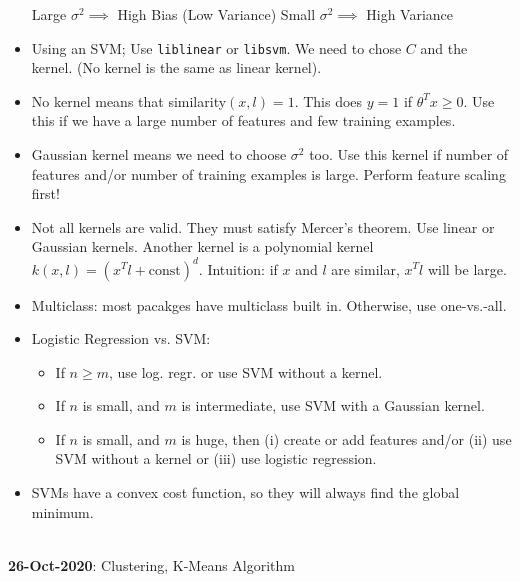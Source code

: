 \documentclass[10pt]{article}
\begin{document}
\begin{itemize}
    Large $\sigma^2 \implies$ High Bias (Low Variance)
    Small $\sigma^2 \implies$ High Variance
  \item Using an SVM; Use \texttt{liblinear} or \texttt{libsvm}. We need to chose $C$ and the kernel. (No kernel is the same as linear kernel).
  \item No kernel means that similarity$(x,l)=1$. This does $y=1$ if $\theta^Tx \geq 0$. Use this if we have a large number of features and few training examples.
  \item Gaussian kernel means we need to choose $\sigma^2$ too. Use this kernel if number of features and/or number of training examples is large. Perform feature scaling first!
  \item Not all kernels are valid. They must satisfy Mercer's theorem. Use linear or Gaussian kernels. Another kernel is a polynomial kernel $k(x,l)=(x^Tl + \text{const})^d$. Intuition: if $x$ and $l$ are similar, $x^Tl$ will be large.
  \item Multiclass: most pacakges have multiclass built in. Otherwise, use one-vs.-all.
  \item Logistic Regression vs. SVM:
    \begin{itemize}
      \item If $n \geq m$, use log. regr. or use SVM without a kernel.
      \item If $n$ is small, and $m$ is intermediate, use SVM with a Gaussian kernel.
      \item If $n$ is small, and $m$ is huge, then (i) create or add features and/or (ii) use SVM without a kernel or (iii) use logistic regression.
    \end{itemize}
  \item SVMs have a convex cost function, so they will always find the global minimum.
\end{itemize}
\hfill \\
{\large \textbf{26-Oct-2020}: Clustering, K-Means Algorithm}
\end{document}
